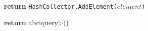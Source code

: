 \begin{figure}[t!]
  \begin{adjustbox}{minipage=[t]{\columnwidth}}
    \begin{algorithm}[H]
      \renewcommand{\thealgorithm}{API Hashchain}         
      \caption{}%
      \label{alg:api-hashchain}%
      \small
      \begin{algorithmic}[1]
      
            \label{alg:hash_add}
                \State \textbf{return} \texttt{HashCollector.AddElement($element$)}
            \EndFunction
      
            \label{alg:hash_get}
                	\State \textbf{return} \<abciquery>()
            \EndFunction
            
        \end{algorithmic}
      \end{algorithm}
	\end{adjustbox}
  \end{figure}
